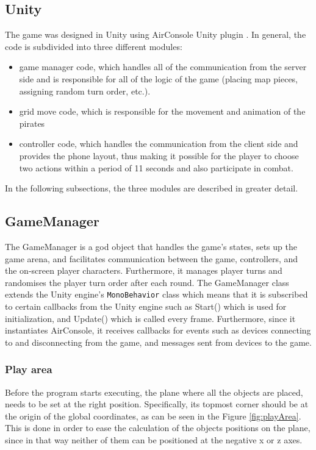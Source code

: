 \subsection{Unity}
The game was designed in Unity using AirConsole Unity plugin \cite{AirconsoleUnity}. In general, the code is subdivided into three different modules: 
\begin{itemize}
	\item game manager code, which handles all of the communication from the server side and is responsible for all of the logic of the game (placing map pieces, assigning random turn order, etc.).
	\item grid move code, which is responsible for the movement and animation of the pirates
	\item controller code, which handles the communication from the client side and provides the phone layout, thus making it possible for the player to choose two actions within a period of 11 seconds and also participate in combat.
\end{itemize}

In the following subsections, the three modules are described in greater detail.

\subsection{GameManager}
The GameManager is a god object that handles the game’s states, sets up the game arena, and facilitates communication between the game,  controllers, and the on-screen player characters. Furthermore, it manages player turns and randomises the player turn order after each round. The GameManager class extends the Unity engine’s \texttt{MonoBehavior} class which means that it is subscribed to certain callbacks from the Unity engine such as Start() which is used for initialization, and Update() which is called every frame. Furthermore, since it instantiates AirConsole, it receives callbacks for events such as devices connecting to and disconnecting from the game, and messages sent from devices to the game. 

\subsubsection{Play area}

Before the program starts executing, the plane where all the objects are placed, needs to be set at the right position. Specifically, its topmost corner should be at the origin of the global coordinates, as can be seen in the Figure \ref{fig:playArea}. This is done in order to ease the calculation of the objects positions on the plane, since in that way neither of them can be positioned at the negative x or z axes.

